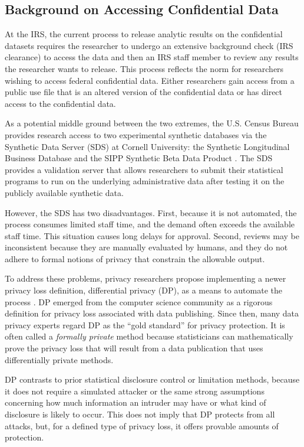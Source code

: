 \subsection{Background on Accessing Confidential Data}\label{subsec:background}
At the IRS, the current process to release analytic results on the confidential datasets requires the researcher to undergo an extensive background check (IRS clearance) to access the data and then an IRS staff member to review any results the researcher wants to release. This process reflects the norm for researchers wishing to access federal confidential data. Either researchers gain access from a public use file that is an altered version of the confidential data or has direct access to the confidential data.

As a potential middle ground between the two extremes, the U.S. Census Bureau provides research access to two experimental synthetic databases via the Synthetic Data Server (SDS) at Cornell University: the Synthetic Longitudinal Business Database and the SIPP Synthetic Beta Data Product \autocite{benedetto2013creation,drechsler2014synthetic}. The SDS provides a validation server that allows researchers to submit their statistical programs to run on the underlying administrative data after testing it on the publicly available synthetic data.

However, the SDS has two disadvantages. First, because it is not automated, the process consumes limited staff time, and the demand often exceeds the available staff time. This situation causes long delays for approval. Second, reviews may be inconsistent because they are manually evaluated by humans, and they do not adhere to formal notions of privacy that constrain the allowable output.

To address these problems, privacy researchers propose implementing a newer privacy loss definition, differential privacy (DP), as a means to automate the process \cite{dwork2006calibrating}. DP emerged from the computer science community as a rigorous definition for privacy loss associated with data publishing. Since then, many data privacy experts regard DP as the ``gold standard'' for privacy protection. It is often called a \textit{formally private} method because statisticians can mathematically prove the privacy loss that will result from a data publication that uses differentially private methods.

DP contrasts to prior statistical disclosure control or limitation methods, because it does not require a simulated attacker or the same strong assumptions concerning how much information an intruder may have or what kind of disclosure is likely to occur. This does not imply that DP protects from all attacks, but, for a defined type of privacy loss, it offers provable amounts of protection.

